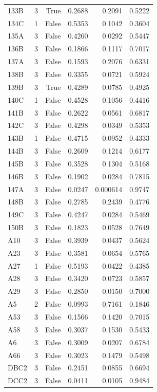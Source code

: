 \begin{longtable}{lrrrrr}
  133B & 3 & True & 0.2688 & 0.2091 & 0.5222 \\
  134C & 1 & False & 0.5353 & 0.1042 & 0.3604 \\
  135A & 3 & False & 0.4260 & 0.0292 & 0.5447 \\
  136B & 3 & False & 0.1866 & 0.1117 & 0.7017 \\
  137A & 3 & False & 0.1593 & 0.2076 & 0.6331 \\
  138B & 3 & False & 0.3355 & 0.0721 & 0.5924 \\
  139B & 3 & True & 0.4289 & 0.0785 & 0.4925 \\
  140C & 1 & False & 0.4528 & 0.1056 & 0.4416 \\
  141B & 3 & False & 0.2622 & 0.0561 & 0.6817 \\
  142C & 3 & False & 0.4298 & 0.0349 & 0.5353 \\
  143B & 1 & False & 0.4715 & 0.0952 & 0.4333 \\
  144B & 3 & False & 0.2609 & 0.1214 & 0.6177 \\
  145B & 3 & False & 0.3528 & 0.1304 & 0.5168 \\
  146B & 3 & False & 0.1902 & 0.0284 & 0.7815 \\
  147A & 3 & False & 0.0247 & 0.000614 & 0.9747 \\
  148B & 3 & False & 0.2785 & 0.2439 & 0.4776 \\
  149C & 3 & False & 0.4247 & 0.0284 & 0.5469 \\
  150B & 3 & False & 0.1823 & 0.0528 & 0.7649 \\
  A10 & 3 & False & 0.3939 & 0.0437 & 0.5624 \\
  A23 & 3 & False & 0.3581 & 0.0654 & 0.5765 \\
  A27 & 1 & False & 0.5193 & 0.0422 & 0.4385 \\
  A28 & 3 & False & 0.3420 & 0.0723 & 0.5857 \\
  A29 & 3 & False & 0.2850 & 0.0150 & 0.7000 \\
  A5 & 2 & False & 0.0993 & 0.7161 & 0.1846 \\
  A53 & 3 & False & 0.1566 & 0.1420 & 0.7015 \\
  A58 & 3 & False & 0.3037 & 0.1530 & 0.5433 \\
  A6 & 3 & False & 0.3009 & 0.0207 & 0.6784 \\
  A66 & 3 & False & 0.3023 & 0.1479 & 0.5498 \\
  DBC2 & 3 & False & 0.2451 & 0.0855 & 0.6694 \\
  DCC2 & 3 & False & 0.0411 & 0.0105 & 0.9484 \\

\end{longtable}
